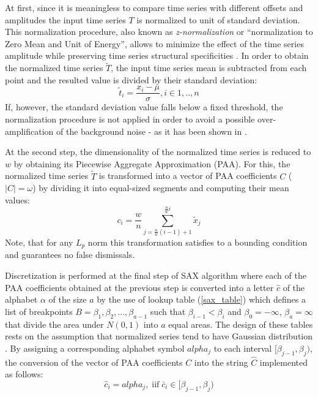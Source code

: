 At first, since it is meaningless to compare time series with different offsets and amplitudes \cite{citeulike:532340} the input time 
series $T$ is normalized to unit of standard deviation. This normalization procedure, also known as \textit{z-normalization} or 
``normalization to Zero Mean and Unit of Energy'', allows to minimize the effect of the time series amplitude while preserving time 
series structural specificities \cite{citeulike:3815880}. In order to obtain the normalized time series $\widetilde{T}$, the 
input time series mean is subtracted from each point and the resulted value is divided by their standard deviation:
\begin{equation}
\widetilde{t}_{i} = \frac{x_{i}-\mu}{\sigma}, i \in {1,..,n}
\label{eq:znorm}
\end{equation}
If, however, the standard deviation value falls below a fixed threshold, the normalization procedure is not applied in order to avoid 
a possible over-amplification of the background noise - as it has been shown in \cite{citeulike:2821475}.

At the second step, the dimensionality of the normalized time series is reduced to $w$ by obtaining its 
Piecewise Aggregate Approximation (PAA). For this, the normalized time series $\widetilde{T}$ is transformed into a vector 
of PAA coefficients $C$ ($|C|=\omega$) by dividing it into equal-sized segments and computing their mean values:
\begin{equation}
c_{i} = \frac{w}{n} \sum_{j=\frac{n}{w}(i-1)+1}^{\frac{n}{w}i} \widetilde{x}_{j}
\label{eq:paa}
\end{equation}
Note, that for any $L_{p}$ norm \cite{citeulike:2946589} \cite{citeulike:3000416} this transformation satisfies to a bounding condition 
and guarantees no false dismissals.

Discretization is performed at the final step of SAX algorithm where each of the PAA coefficients obtained at the previous step 
is converted into a letter $\widehat{c}$ of the alphabet $\alpha$ of the size $a$ by the use of lookup table (\ref{sax_table}) which defines a 
list of breakpoints $B=\beta_{1}, \beta_{2}, ... , \beta_{a-1}$ such that $\beta_{i-1} < \beta_{i}$ and $\beta_{0} = -\infty$, $\beta_{a} = \infty$ 
that divide the area under $N(0,1)$ into $a$ equal areas. The design of these tables rests on the assumption that normalized series tend to have 
Gaussian distribution \cite{citeulike:10141990} \cite{sax}.
By assigning a corresponding alphabet symbol $alpha_{j}$ to each interval $[\beta_{j-1},\beta_{j})$, the conversion of the vector of PAA coefficients 
$C$ into the string $\widehat{C}$ implemented as follows: 
\begin{equation}
\widehat{c}_{i} = alpha_{j}, \; \text{iif} \; \bar{c}_{i} \in [\beta_{j-1},\beta_{j})
\label{eq:sax_alphabet}
\end{equation}

